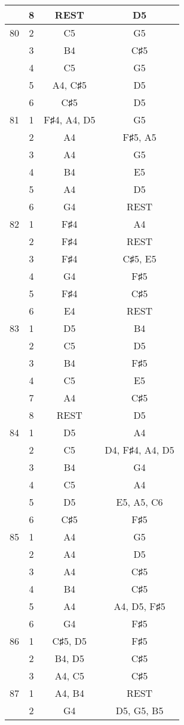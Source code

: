 \documentclass{article}
\begin{document}
\begin{longtable}{|c|c|c|c|}
  & 8 & REST & D5 \\ 
\hline
80 & 2 & C5 & G5 \\ 
  & 3 & B4 & C♯5 \\ 
  & 4 & C5 & G5 \\ 
  & 5 & A4, C♯5 & D5 \\ 
  & 6 & C♯5 & D5 \\ 
\hline
81 & 1 & F♯4, A4, D5 & G5 \\ 
  & 2 & A4 & F♯5, A5 \\ 
  & 3 & A4 & G5 \\ 
  & 4 & B4 & E5 \\ 
  & 5 & A4 & D5 \\ 
  & 6 & G4 & REST \\ 
\hline
82 & 1 & F♯4 & A4 \\ 
  & 2 & F♯4 & REST \\ 
  & 3 & F♯4 & C♯5, E5 \\ 
  & 4 & G4 & F♯5 \\ 
  & 5 & F♯4 & C♯5 \\ 
  & 6 & E4 & REST \\ 
\hline
83 & 1 & D5 & B4 \\ 
  & 2 & C5 & D5 \\ 
  & 3 & B4 & F♯5 \\ 
  & 4 & C5 & E5 \\ 
  & 7 & A4 & C♯5 \\ 
  & 8 & REST & D5 \\ 
\hline
84 & 1 & D5 & A4 \\ 
  & 2 & C5 & D4, F♯4, A4, D5 \\ 
  & 3 & B4 & G4 \\ 
  & 4 & C5 & A4 \\ 
  & 5 & D5 & E5, A5, C6 \\ 
  & 6 & C♯5 & F♯5 \\ 
\hline
85 & 1 & A4 & G5 \\ 
  & 2 & A4 & D5 \\ 
  & 3 & A4 & C♯5 \\ 
  & 4 & B4 & C♯5 \\ 
  & 5 & A4 & A4, D5, F♯5 \\ 
  & 6 & G4 & F♯5 \\ 
\hline
86 & 1 & C♯5, D5 & F♯5 \\ 
  & 2 & B4, D5 & C♯5 \\ 
  & 3 & A4, C5 & C♯5 \\ 
\hline
87 & 1 & A4, B4 & REST \\ 
  & 2 & G4 & D5, G5, B5 \\ 

\end{longtable}
\end{document}
